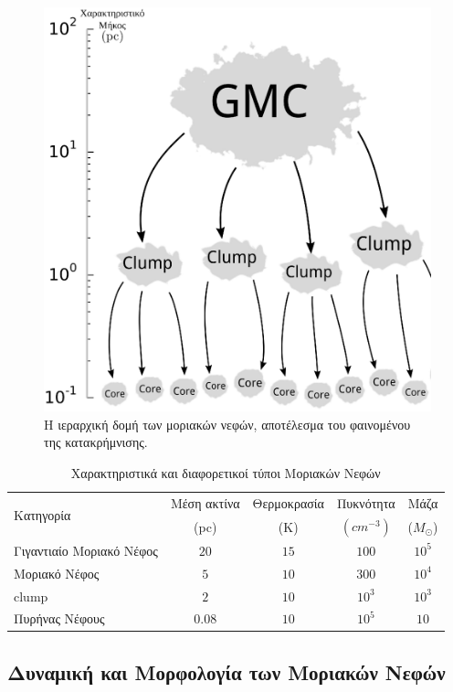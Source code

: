 \documentclass[a4paper,12pt]{memoir}
\newcommand{\sm}{$M_{\odot}$}
\begin{document}
\begin{figure}[h]
	\centering
	\includegraphics[width=15cm]{images/fragmentation.ps}
	\caption{Η ιεραρχική δομή των μοριακών νεφών, αποτέλεσμα του φαινομένου της κατακρήμνισης.}
\end{figure}

\begin{table}
	\caption{Χαρακτηριστικά και διαφορετικοί τύποι Μοριακών Νεφών}
	\label{tab:MCtypes}
	\begin{tabular}{l c c c c}
		\toprule
		\multirow{2}{*}{Κατηγορία} & Μέση ακτίνα &  Θερμοκρασία & Πυκνότητα \ce{H2} & Μάζα \\ 
		& (pc) & (K) & $(cm^{-3})$ & (\sm) \\
		\midrule
		Γιγαντιαίο Μοριακό Νέφος & $20$ & $15$ & $100$ & $10^5$ \\
		Μοριακό Νέφος & $5$ & $10$ & $300$ & $10^4$\\
		clump & $2$ & $10$ & $10^3$ & $10^3$\\
		Πυρήνας Νέφους & $0.08$ & $10$ & $10^5$ & $10$\\
		\bottomrule
	\end{tabular}
\end{table}

\subsection{Δυναμική και Μορφολογία των Μοριακών Νεφών}
\end{document}
